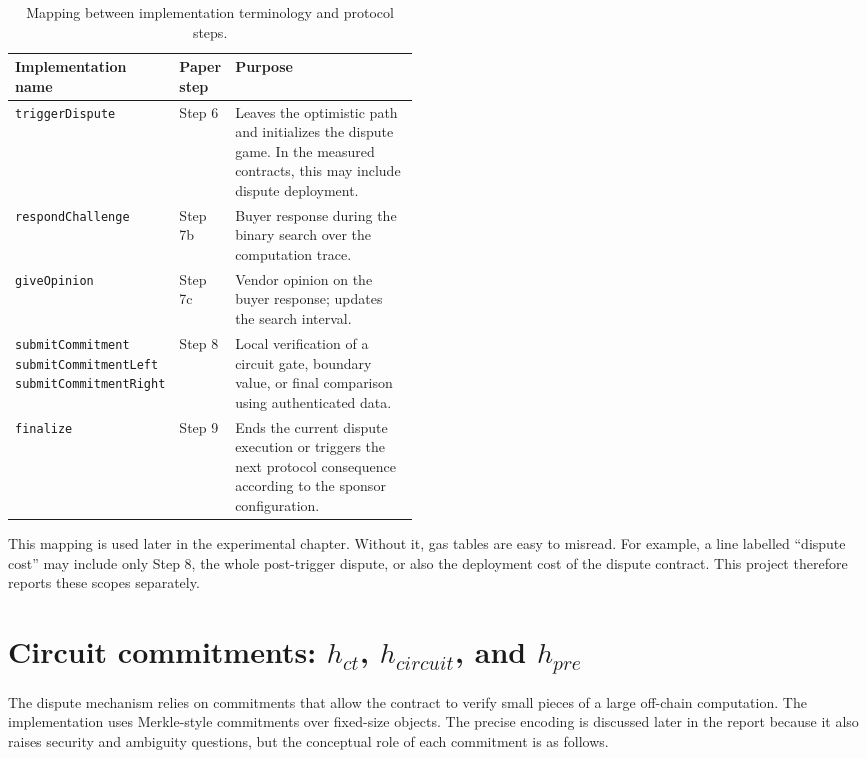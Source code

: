 \begin{table}[htbp]
  \centering
  \begin{tabularx}{\linewidth}{>{\raggedright\arraybackslash}p{0.34\linewidth}>{\raggedright\arraybackslash}p{0.13\linewidth}>{\raggedright\arraybackslash}X}
    \toprule
    Implementation name & Paper step & Purpose \\
    \midrule
    \texttt{triggerDispute} &
    Step 6 &
    Leaves the optimistic path and initializes the dispute game. In the measured contracts,
    this may include dispute deployment. \\
    \texttt{respondChallenge} &
    Step 7b &
    Buyer response during the binary search over the computation trace. \\
    \texttt{giveOpinion} &
    Step 7c &
    Vendor opinion on the buyer response; updates the search interval. \\
    \texttt{submitCommitment}\newline
    \texttt{submitCommitmentLeft}\newline
    \texttt{submitCommitmentRight} &
    Step 8 &
    Local verification of a circuit gate, boundary value, or final comparison using
    authenticated data. \\
    \texttt{finalize} &
    Step 9 &
    Ends the current dispute execution or triggers the next protocol consequence according
    to the sponsor configuration. \\
    \bottomrule
  \end{tabularx}
  \caption{Mapping between implementation terminology and protocol steps.}
  \label{tab:background-step-mapping}
\end{table}

This mapping is used later in the experimental chapter. Without it, gas tables are easy to
misread. For example, a line labelled ``dispute cost'' may include only Step 8, the whole
post-trigger dispute, or also the deployment cost of the dispute contract. This project
therefore reports these scopes separately.

\section[Circuit commitments: hct, hcircuit, and hpre]{Circuit commitments: \(h_{ct}\), \(h_{circuit}\), and \(h_{pre}\)}

The dispute mechanism relies on commitments that allow the contract to verify small pieces of
a large off-chain computation. The implementation uses Merkle-style commitments over
fixed-size objects. The precise encoding is discussed later in the report because it also
raises security and ambiguity questions, but the conceptual role of each commitment is as
follows.

